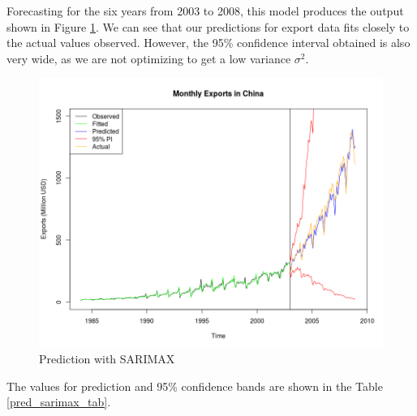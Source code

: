 \documentclass[]{article}
\begin{document}
Forecasting for the six years from 2003 to 2008, this model produces the output shown in Figure \ref{pred_sarimax}. We can see that our predictions for export data fits closely to the actual values observed. However, the 95\% confidence interval obtained is also very wide, as we are not optimizing to get a low variance $\sigma^2$. 

\begin{figure}[!ht]
\centering
\includegraphics[width=.8\textwidth]{pred_sarimax}
\caption{Prediction with SARIMAX}
\label{pred_sarimax}
\end{figure}

The values for prediction and 95\% confidence bands are shown in the Table \ref{pred_sarimax_tab}.

\begin{table}[!ht]
\centering
{}
\caption{2003 forecast and 95\% confidence interval bands for SARIMAX}
\label{pred_sarimax_tab}
\end{table}
\end{document}
